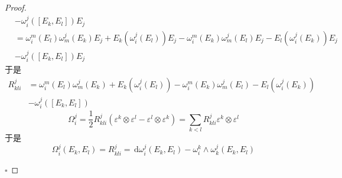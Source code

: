 \documentclass[../../几何与拓扑.tex]{subfiles}
\begin{document}
\begin{proof}
\[\begin{aligned}
       &- \omega _{i}^{j}\left( \left[ E_{k},E_{l} \right]  \right)E_{j}     \\ 
        &=   \omega _{i}^{m}\left( E_{l} \right) \omega _{m}^{j}\left( E_{k} \right)E_{j}+ E_{k}\left(  \omega _{i}^{j}\left( E_{l} \right)  \right)E_{j}- \omega _{i}^{m}\left( E_{k} \right) \omega _{m}^{j}\left( E_{l} \right)E_{j} -E_{l}\left(  \omega _{i}^{j}\left( E_{k} \right)  \right)E_{j}\\ 
         &- \omega _{i}^{j}\left( \left[  E_{k},E_{l} \right]  \right)E_{j}       
  \end{aligned}
  \]于是 \[
  \begin{aligned}
  R_{kli}^{j}&=  \omega _{i}^{m}\left( E_{l} \right) \omega _{m}^{j}\left( E_{k} \right)+ E_{k}\left(  \omega _{i}^{j}\left( E_{l} \right)  \right)- \omega _{i}^{m}\left( E_{k} \right) \omega _{m}^{j}\left( E_{l} \right)-E_{l}\left(  \omega _{i}^{j}\left( E_{k} \right)  \right)\\ 
   &- \omega _{i}^{j}\left( \left[ E_{k},E_{l} \right]  \right)
  \end{aligned}
  \] 
\[
 \Omega _{i}^{j}= \frac{1}{2}R_{kli}^{j}\left(  \varepsilon ^{k}\otimes  \varepsilon ^{l}- \varepsilon ^{l}\otimes  \varepsilon ^{k} \right) = \sum _{k<l}R_{kli}^{j} \varepsilon ^{k}\otimes  \varepsilon ^{l}
\]于是 \[
 \Omega _{i}^{j}\left( E_{k},E_{l} \right)= R_{kli}^{j} = \,\mathrm{d}  \omega _{i}^{j}\left( E_{k},E_{l} \right)-  \omega _{i}^{k}\wedge  \omega _{k}^{j}\left( E_{k},E_{l} \right)  
\]

  \hfill $\square$
\end{proof}
\hspace*{\fill} 
\end{document}
